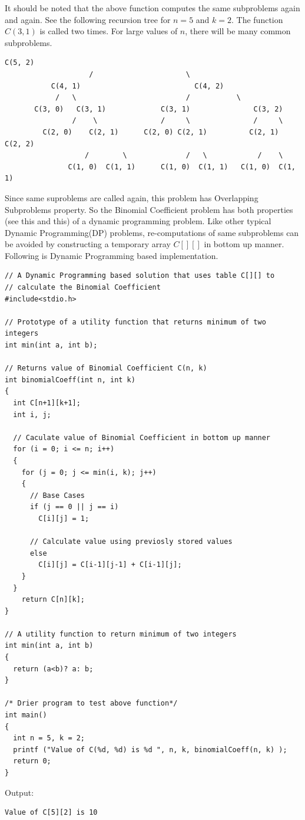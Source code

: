 It should be noted that the above function computes the same subproblems
again and again. See the following recursion tree for $n = 5$ and $k = 2$.
The function $C(3,1)$ is called two times. For large values of $n$, there
will be many common subproblems.
\begin{lstlisting}[style=raygeneric]
                             C(5, 2)
                    /                      \
           C(4, 1)                           C(4, 2)
            /   \                          /           \
       C(3, 0)   C(3, 1)             C(3, 1)               C(3, 2)
                /    \               /     \               /     \
         C(2, 0)    C(2, 1)      C(2, 0) C(2, 1)          C(2, 1)  C(2, 2)
                   /        \              /   \            /    \
               C(1, 0)  C(1, 1)      C(1, 0)  C(1, 1)   C(1, 0)  C(1, 1)
\end{lstlisting}
Since same suproblems are called again, this problem has Overlapping
Subproblems property. So the Binomial Coefficient problem has both
properties (see this and this) of a dynamic programming problem. Like other
typical Dynamic Programming(DP) problems, re-computations of same
subproblems can be avoided by constructing a temporary array $C[][]$ in
bottom up manner. Following is Dynamic Programming based implementation.
\begin{lstlisting}[style=raycppnewsnippet]
// A Dynamic Programming based solution that uses table C[][] to
// calculate the Binomial Coefficient
#include<stdio.h>
 
// Prototype of a utility function that returns minimum of two integers
int min(int a, int b);
 
// Returns value of Binomial Coefficient C(n, k)
int binomialCoeff(int n, int k)
{
  int C[n+1][k+1];
  int i, j;
 
  // Caculate value of Binomial Coefficient in bottom up manner
  for (i = 0; i <= n; i++)
  {
    for (j = 0; j <= min(i, k); j++)
    {
      // Base Cases
      if (j == 0 || j == i)
        C[i][j] = 1;
 
      // Calculate value using previosly stored values
      else
        C[i][j] = C[i-1][j-1] + C[i-1][j];
    }
  }
    return C[n][k];
}

// A utility function to return minimum of two integers
int min(int a, int b)
{
  return (a<b)? a: b;
}
 
/* Drier program to test above function*/
int main()
{
  int n = 5, k = 2;
  printf ("Value of C(%d, %d) is %d ", n, k, binomialCoeff(n, k) );
  return 0;
}
\end{lstlisting}
Output:
\begin{lstlisting}[style=rayio]
Value of C[5][2] is 10
\end{lstlisting}

